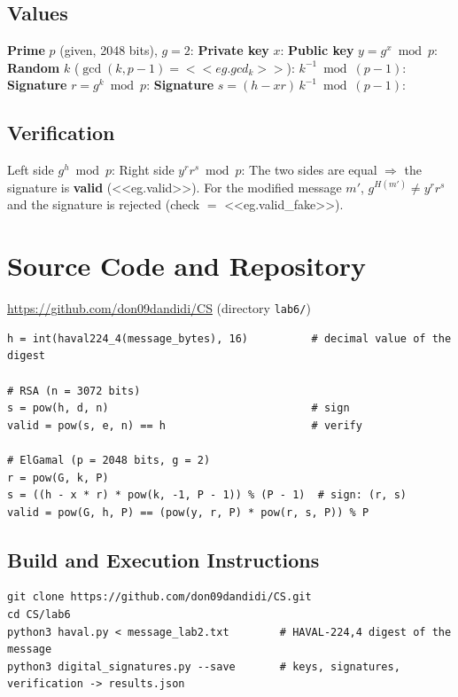 \documentclass[12pt,a4paper]{article}
\begin{document}
\subsection{Values}
\noindent\textbf{Prime} $p$ (given, 2048 bits), $g = 2$:
\noindent\textbf{Private key} $x$:
\noindent\textbf{Public key} $y = g^{x} \bmod p$:
\noindent\textbf{Random} $k$ ($\gcd(k,p-1) = <<eg.gcd_k>>$):
\noindent$k^{-1} \bmod (p-1)$:
\noindent\textbf{Signature} $r = g^{k} \bmod p$:
\noindent\textbf{Signature} $s = (h - x r)\,k^{-1} \bmod (p-1)$:

\subsection{Verification}
\noindent Left side $g^{h} \bmod p$:
\noindent Right side $y^{r} r^{s} \bmod p$:
The two sides are equal $\Rightarrow$ the signature is \textbf{valid} (<<eg.valid>>). For the
modified message $m'$, $g^{H(m')} \ne y^{r} r^{s}$ and the signature is rejected
(check $=$ <<eg.valid_fake>>).

\section{Source Code and Repository}
\begin{center}
\url{https://github.com/don09dandidi/CS} \quad (directory \texttt{lab6/})
\end{center}
\begin{lstlisting}[style=py, caption={Signing and verification (excerpt from \texttt{digital\_signatures.py})}]
h = int(haval224_4(message_bytes), 16)          # decimal value of the digest

# RSA (n = 3072 bits)
s = pow(h, d, n)                                # sign
valid = pow(s, e, n) == h                       # verify

# ElGamal (p = 2048 bits, g = 2)
r = pow(G, k, P)
s = ((h - x * r) * pow(k, -1, P - 1)) % (P - 1)  # sign: (r, s)
valid = pow(G, h, P) == (pow(y, r, P) * pow(r, s, P)) % P
\end{lstlisting}

\subsection{Build and Execution Instructions}
\begin{lstlisting}[style=sh]
git clone https://github.com/don09dandidi/CS.git
cd CS/lab6
python3 haval.py < message_lab2.txt        # HAVAL-224,4 digest of the message
python3 digital_signatures.py --save       # keys, signatures, verification -> results.json
\end{lstlisting}
\end{document}

